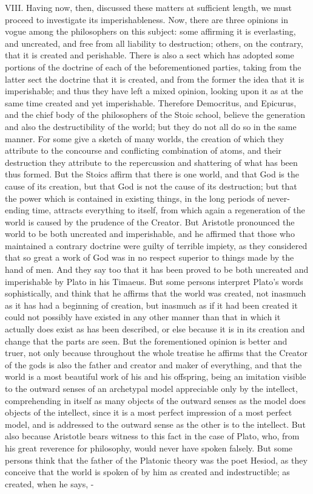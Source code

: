 VIII. Having now, then, discussed these matters at sufficient length, we must proceed to investigate
its imperishableness. Now, there are three opinions in vogue among the philosophers on this
subject: some affirming it is everlasting, and uncreated, and free from all liability to destruction;
others, on the contrary, that it is created and perishable. There is also a sect which has adopted
some portions of the doctrine of each of the beforementioned parties, taking from the latter sect
the doctrine that it is created, and from the former the idea that it is imperishable; and thus they
have left a mixed opinion, looking upon it as at the same time created and yet imperishable.
Therefore Democritus, and Epicurus, and the chief body of the philosophers of the Stoic school,
believe the generation and also the destructibility of the world; but they do not all do so in the same
manner. For some give a sketch of many worlds, the creation of which they attribute to the
concourse and conflicting combination of atoms, and their destruction they attribute to the
repercussion and shattering of what has been thus formed. But the Stoics affirm that there is one
world, and that God is the cause of its creation, but that God is not the cause of its destruction; but
that the power which is contained in existing things, in the long periods of never-ending time,
attracts everything to itself, from which again a regeneration of the world is caused by the
prudence of the Creator. But Aristotle pronounced the world to be both uncreated and
imperishable, and he affirmed that those who maintained a contrary doctrine were guilty of terrible
impiety, as they considered that so great a work of God was in no respect superior to things made
by the hand of men. And they say too that it has been proved to be both uncreated and
imperishable by Plato in his Timaeus. But some persons interpret Plato's words sophistically, and
think that he affirms that the world was created, not inasmuch as it has had a beginning of creation,
but inasmuch as if it had been created it could not possibly have existed in any other manner than
that in which it actually does exist as has been described, or else because it is in its creation and
change that the parts are seen. But the forementioned opinion is better and truer, not only because
throughout the whole treatise he affirms that the Creator of the gods is also the father and creator
and maker of everything, and that the world is a most beautiful work of his and his offspring, being
an imitation visible to the outward senses of an archetypal model appreciable only by the intellect,
comprehending in itself as many objects of the outward senses as the model does objects of the
intellect, since it is a most perfect impression of a most perfect model, and is addressed to the
outward sense as the other is to the intellect. But also because Aristotle bears witness to this fact
in the case of Plato, who, from his great reverence for philosophy, would never have spoken
falsely. But some persons think that the father of the Platonic theory was the poet Hesiod, as they
conceive that the world is spoken of by him as created and indestructible; as created, when he
says, -

